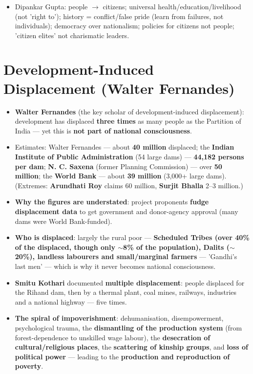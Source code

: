 \begin{QuickRevision}
\begin{itemize}
\item Dipankar Gupta: people $\rightarrow$ citizens; universal health/education/livelihood (not 'right to'); history = conflict/false pride (learn from failures, not individuals); democracy over nationalism; policies for citizens not people; 'citizen elites' not charismatic leaders.
\end{itemize}
\end{QuickRevision}

\section{Development-Induced Displacement (Walter Fernandes)}

\begin{KeyConcept}
\begin{itemize}
\item \textbf{Walter Fernandes} (the key scholar of development-induced displacement): development has displaced \textbf{three times} as many people as the Partition of India --- yet this is \textbf{not part of national consciousness}.
\item Estimates: Walter Fernandes --- about \textbf{40 million} displaced; the \textbf{Indian Institute of Public Administration} (54 large dams) --- \textbf{44,182 persons per dam}; \textbf{N. C. Saxena} (former Planning Commission) --- over \textbf{50 million}; the \textbf{World Bank} --- about \textbf{39 million} (3,000+ large dams). (Extremes: \textbf{Arundhati Roy} claims 60 million, \textbf{Surjit Bhalla} 2--3 million.)
\item \textbf{Why the figures are understated}: project proponents \textbf{fudge displacement data} to get government and donor-agency approval (many dams were World Bank-funded).
\item \textbf{Who is displaced}: largely the rural poor --- \textbf{Scheduled Tribes (over 40\% of the displaced, though only $\sim$8\% of the population), Dalits ($\sim$20\%), landless labourers and small/marginal farmers} --- 'Gandhi's last men' --- which is why it never becomes national consciousness.
\item \textbf{Smitu Kothari} documented \textbf{multiple displacement}: people displaced for the Rihand dam, then by a thermal plant, coal mines, railways, industries and a national highway --- five times.
\item \textbf{The spiral of impoverishment}: dehumanisation, disempowerment, psychological trauma, the \textbf{dismantling of the production system} (from forest-dependence to unskilled wage labour), the \textbf{desecration of cultural/religious places}, the \textbf{scattering of kinship groups}, and \textbf{loss of political power} --- leading to the \textbf{production and reproduction of poverty}.

\end{itemize}
\end{KeyConcept}
